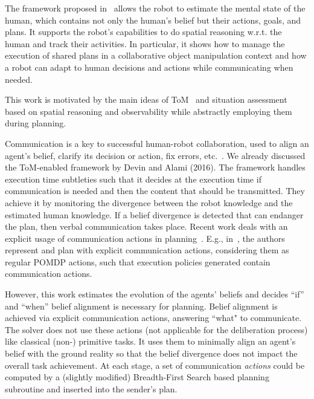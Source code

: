 \documentclass[letterpaper]{article} %
\begin{document}
The framework proposed in~\cite{devin2016implemented} allows the robot to estimate the mental state of the human, which contains not only the human's belief but their actions, goals, and plans. It supports the robot's capabilities to do spatial reasoning w.r.t. the human and track their activities. In particular, it shows how to manage the execution of shared plans in a collaborative object manipulation context and how a robot can adapt to human decisions and actions while communicating when needed.

This work is motivated by the main ideas of ToM~\cite{devin2016implemented} and situation assessment based on spatial reasoning and observability while abstractly employing them during planning. 

Communication is a key to successful human-robot collaboration, used to align an agent's belief, clarify its decision or action, fix errors, etc.~\cite{tellex2014asking,sebastiani2017dealing}. We already discussed the ToM-enabled framework by Devin and Alami (2016). The framework handles execution time subtleties such that it decides at the execution time if communication is needed and then the content that should be transmitted. 
They achieve it by monitoring the divergence between the robot knowledge and the estimated human knowledge. If a belief divergence is detected that can endanger the plan, then verbal communication takes place. 
Recent work deals with an explicit usage of communication actions in planning~\cite{BuisanSA20,nikolaidis2018planning,roncone2017transparent,sanelli2017short,UnhelkarLS20}. 
E.g., in~\cite{roncone2017transparent,UnhelkarLS20}, the authors represent and plan with explicit communication actions, considering them as regular POMDP actions, such that execution policies generated contain communication actions.

However, this work estimates the evolution of the agents' beliefs and decides ``if'' and ``when'' belief alignment is necessary for planning. Belief alignment is achieved via explicit communication actions, answering ``what" to communicate. 
The solver does not use these actions (not applicable for the deliberation process) like classical (non-) primitive tasks. It uses them to minimally align an agent's belief with the ground reality so that the belief divergence does not impact the overall task achievement. 
At each stage, a set of communication \textit{actions} could be computed by a (slightly modified) Breadth-First Search based planning subroutine and inserted into the sender's plan.
\end{document}
